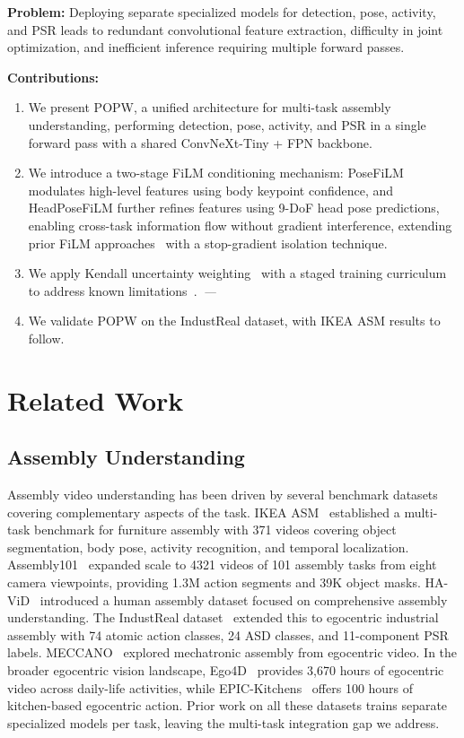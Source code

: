 \documentclass[10pt,twocolumn]{article}
\newcommand{\popw}{POPW}
\newcommand{\todo}{\textit{---}}
\newcommand{\popwres}{\todo}
\begin{document}
\textbf{Problem:} Deploying separate specialized models for detection, pose, activity, and PSR leads to redundant convolutional feature extraction, difficulty in joint optimization, and inefficient inference requiring multiple forward passes.

\textbf{Contributions:}
\begin{enumerate}
\item We present \popw{}, a unified architecture for multi-task assembly understanding, performing detection, pose, activity, and PSR in a single forward pass with a shared ConvNeXt-Tiny + FPN backbone.
\item We introduce a two-stage FiLM conditioning mechanism: PoseFiLM modulates high-level features using body keypoint confidence, and HeadPoseFiLM further refines features using 9-DoF head pose predictions, enabling cross-task information flow without gradient interference, extending prior FiLM approaches~\cite{perez2018film} with a stop-gradient isolation technique.
\item We apply Kendall uncertainty weighting~\cite{kendall2018multi} with a staged training curriculum to address known limitations~\cite{kirchdorfer2025}.~\popwres
\item We validate \popw{} on the IndustReal dataset, with IKEA ASM results to follow.
\end{enumerate}

\section{Related Work}
\label{sec:related}

\subsection{Assembly Understanding}

Assembly video understanding has been driven by several benchmark datasets covering complementary aspects of the task. IKEA ASM~\cite{benshabat2021ikea} established a multi-task benchmark for furniture assembly with 371 videos covering object segmentation, body pose, activity recognition, and temporal localization. Assembly101~\cite{sener2022assembly101} expanded scale to 4321 videos of 101 assembly tasks from eight camera viewpoints, providing 1.3M action segments and 39K object masks. HA-ViD~\cite{zhang2023havid} introduced a human assembly dataset focused on comprehensive assembly understanding. The IndustReal dataset~\cite{schoonbeek2024industreal} extended this to egocentric industrial assembly with 74 atomic action classes, 24 ASD classes, and 11-component PSR labels. MECCANO~\cite{ragusa2023meccano} explored mechatronic assembly from egocentric video. In the broader egocentric vision landscape, Ego4D~\cite{grauman2022ego4d} provides 3,670 hours of egocentric video across daily-life activities, while EPIC-Kitchens~\cite{damen2022epic} offers 100 hours of kitchen-based egocentric action. Prior work on all these datasets trains separate specialized models per task, leaving the multi-task integration gap we address.
\end{document}
